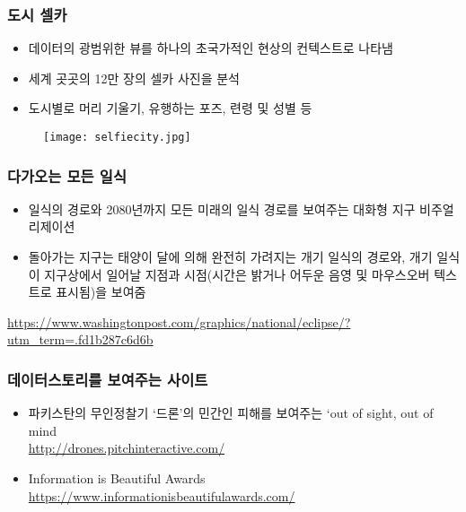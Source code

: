 \documentclass[10pt]{beamer}
\begin{document}
\begin{frame}
\frametitle{도시 셀카}
\begin{itemize}
	\item 데이터의 광범위한 뷰를 하나의 초국가적인 현상의 컨텍스트로 나타냄
	\item 세계 곳곳의 12만 장의 셀카 사진을 분석
	\item 도시별로 머리 기울기, 유행하는 포즈, 련령 및 성별 등
\end{itemize}
	\begin{figure}
		\texttt{[image: selfiecity.jpg]}
	\end{figure}
\end{frame}

\begin{frame}
\frametitle{다가오는 모든 일식}
	\begin{itemize}
		\item 일식의 경로와 2080년까지 모든 미래의 일식 경로를 보여주는 대화형 지구 비주얼리제이션
		\item 돌아가는 지구는 태양이 달에 의해 완전히 가려지는 개기 일식의 경로와, 개기 일식이 지구상에서 일어날 지점과 시점(시간은 밝거나 어두운 음영 및 마우스오버 텍스트로 표시됨)을 보여줌
	\end{itemize}
	\url{https://www.washingtonpost.com/graphics/national/eclipse/? utm_term=.fd1b287c6d6b}
\end{frame}

\begin{frame}
\frametitle{데이터스토리를 보여주는 사이트}
	\begin{itemize}
		\item 파키스탄의 무인정찰기 ‘드론’의 민간인 피해를 보여주는 ‘out of sight, out of mind \\
		\url{http://drones.pitchinteractive.com/}
		\item Information is Beautiful Awards \\
		\url{https://www.informationisbeautifulawards.com/}
	\end{itemize}
\end{frame}
\end{document}
